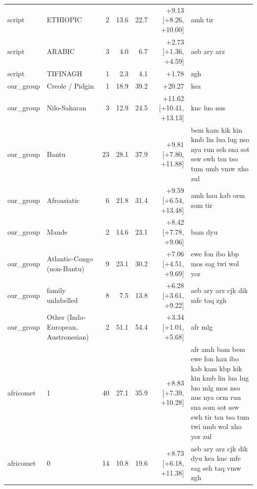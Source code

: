 {\begin{longtable}{@{}llrrrrp{4.3cm}@{}}
script & ETHIOPIC & 2 & 13.6 & 22.7 & +9.13 [+8.26, +10.00] & amh tir \\
script & ARABIC & 3 & 4.0 & 6.7 & +2.73 [+1.36, +4.59] & aeb ary arz \\
script & TIFINAGH & 1 & 2.3 & 4.1 & +1.78 & zgh \\
our\_group & Creole / Pidgin & 1 & 18.9 & 39.2 & +20.27 & kea \\
our\_group & Nilo-Saharan & 3 & 12.9 & 24.5 & +11.62 [+10.41, +13.13] & knc luo nus \\
our\_group & Bantu & 23 & 28.1 & 37.9 & +9.81 [+7.80, +11.88] & bem kam kik kin kmb lin lua lug nso nya run seh sna sot ssw swh tsn tso tum umb vmw xho zul \\
our\_group & Afroasiatic & 6 & 21.8 & 31.4 & +9.59 [+6.54, +13.48] & amh hau kab orm som tir \\
our\_group & Mande & 2 & 14.6 & 23.1 & +8.42 [+7.78, +9.06] & bam dyu \\
our\_group & Atlantic-Congo (non-Bantu) & 9 & 23.1 & 30.2 & +7.06 [+4.51, +9.69] & ewe fon ibo kbp mos sag twi wol yor \\
our\_group & family unlabelled & 8 & 7.5 & 13.8 & +6.28 [+3.61, +9.22] & aeb ary arz cjk dik mfe taq zgh \\
our\_group & Other (Indo-European, Austronesian) & 2 & 51.1 & 54.4 & +3.34 [+1.01, +5.68] & afr mlg \\
africomet & 1 & 40 & 27.1 & 35.9 & +8.83 [+7.39, +10.28] & afr amh bam bem ewe fon hau ibo kab kam kbp kik kin kmb lin lua lug luo mlg mos nso nus nya orm run sna som sot ssw swh tir tsn tso tum twi umb wol xho yor zul \\
africomet & 0 & 14 & 10.8 & 19.6 & +8.73 [+6.18, +11.38] & aeb ary arz cjk dik dyu kea knc mfe sag seh taq vmw zgh \\
\end{longtable}}
